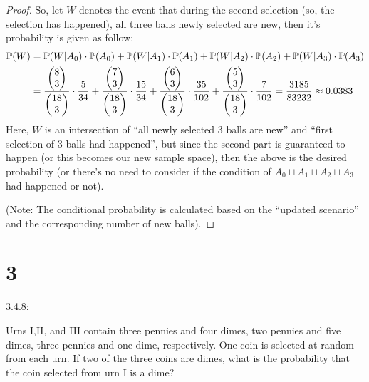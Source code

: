 \documentclass{article}
\begin{document}
\begin{proof}
    So, let $W$ denotes the event that during the second selection (so, the selection has happened), all three balls newly selected are new, then it's probability is given as follow:
    \begin{align}
        \mathbb{P}(W)&=\mathbb{P}(W|A_0)\cdot \mathbb{P}(A_0)+\mathbb{P}(W|A_1)\cdot \mathbb{P}(A_1)+\mathbb{P}(W|A_2)\cdot \mathbb{P}(A_2)+\mathbb{P}(W|A_3)\cdot \mathbb{P}(A_3)\\
        &= \frac{\begin{pmatrix}8\\3\end{pmatrix}}{\begin{pmatrix}18\\3\end{pmatrix}}\cdot \frac{5}{34}+\frac{\begin{pmatrix}7\\3\end{pmatrix}}{\begin{pmatrix}18\\3\end{pmatrix}}\cdot \frac{15}{34}+\frac{\begin{pmatrix}6\\3\end{pmatrix}}{\begin{pmatrix}18\\3\end{pmatrix}}\cdot\frac{35}{102}+\frac{\begin{pmatrix}5\\3\end{pmatrix}}{\begin{pmatrix}18\\3\end{pmatrix}}\cdot\frac{7}{102} = \frac{3185}{83232}\approx 0.0383
    \end{align}
    Here, $W$ is an intersection of ``all newly selected 3 balls are new'' and ``first selection of 3 balls had happened'', but since the second part is guaranteed to happen (or this becomes our new sample space), then the above is the desired probability (or there's no need to consider if the condition of $A_0\sqcup A_1\sqcup A_2\sqcup A_3$ had happened or not).

    (Note: The conditional probability is calculated based on the ``updated scenario'' and the corresponding number of new balls).
\end{proof}

\newpage
\section*{3}
\begin{ques}\label{q3}
    3.4.8:

    Urns I,II, and III contain three pennies and four dimes, two pennies and five dimes, three pennies and one dime, respectively. One coin is selected at random from each urn. If two of the three coins are dimes, what is the probability that the coin selected from urn I is a dime?
\end{ques}
\end{document}
